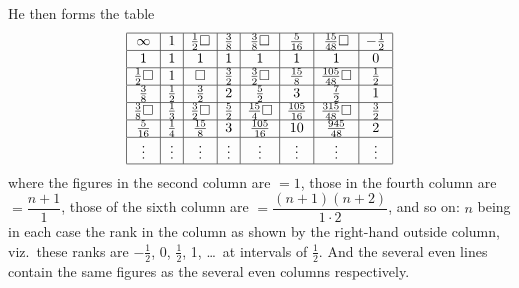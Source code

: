\documentclass[11pt,a4paper]{article}
\begin{document}
He then forms the table
\[
\begin{array}{|c|c|c|c|c|c|c|c|}
\hline
\infty & 1 & \tfrac{1}{2}\Box & \tfrac{3}{8} & \tfrac{3}{8}\Box & \tfrac{5}{16} & \tfrac{15}{48}\Box & -\tfrac{1}{2}\\
\hline
1 & 1 & 1 & 1 & 1 & 1 & 1 & 0 \\
\hline
\tfrac{1}{2}\Box & 1 & \Box & \tfrac{3}{2} & \tfrac{3}{2}\Box & \tfrac{15}{8} & \tfrac{105}{48}\Box & \tfrac{1}{2}\\
\hline
\tfrac{3}{8} & \tfrac{1}{2} & \tfrac{3}{2} & 2 & \tfrac{5}{2} & 3 & \tfrac{7}{2} & 1 \\
\hline
\tfrac{3}{8}\Box & \tfrac{1}{3} & \tfrac{3}{2}\Box & \tfrac{5}{2} & \tfrac{15}{4}\Box & \tfrac{105}{16} & \tfrac{315}{48}\Box & \tfrac{3}{2}\\
\hline
\tfrac{5}{16} & \tfrac{1}{4} & \tfrac{15}{8} & 3 & \tfrac{105}{16} & 10 & \tfrac{945}{48} & 2 \\
\hline
\vdots & \vdots & \vdots & \vdots & \vdots & \vdots & \vdots & \vdots\\
\hline
\end{array}
\]
where the figures in the second column are $= 1$, those in the fourth column are $= \dfrac{n+1}{1}$, those of the sixth column are $= \dfrac{(n+1)(n+2)}{1 \cdot 2}$, and so on: $n$ being in each case the rank in the column as shown by the right-hand outside column, viz.\ these ranks are $-\tfrac{1}{2}$, 0, $\tfrac{1}{2}$, 1, \ldots\ at intervals of $\tfrac{1}{2}$. And the several even lines contain the same figures as the several even columns respectively.
\end{document}
